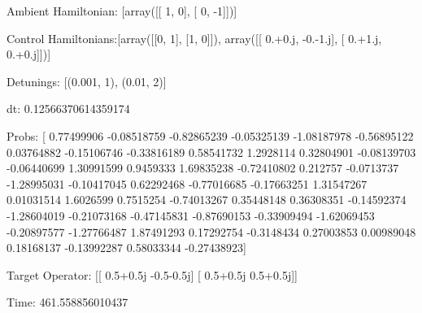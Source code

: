 \documentclass{article}
\begin{document}
    

\newpage

Ambient Hamiltonian: [array([[ 1,  0],
       [ 0, -1]])]

Control Hamiltonians:[array([[0, 1],
       [1, 0]]), array([[ 0.+0.j, -0.-1.j],
       [ 0.+1.j,  0.+0.j]])]

Detunings: [(0.001, 1), (0.01, 2)]

 dt: 0.12566370614359174

Probs: [ 0.77499906 -0.08518759 -0.82865239 -0.05325139 -1.08187978 -0.56895122
  0.03764882 -0.15106746 -0.33816189  0.58541732  1.2928114   0.32804901
 -0.08139703 -0.06440699  1.30991599  0.9459333   1.69835238 -0.72410802
  0.212757   -0.0713737  -1.28995031 -0.10417045  0.62292468 -0.77016685
 -0.17663251  1.31547267  0.01031514  1.6026599   0.7515254  -0.74013267
  0.35448148  0.36308351 -0.14592374 -1.28604019 -0.21073168 -0.47145831
 -0.87690153 -0.33909494 -1.62069453 -0.20897577 -1.27766487  1.87491293
  0.17292754 -0.3148434   0.27003853  0.00989048  0.18168137 -0.13992287
  0.58033344 -0.27438923]

Target Operator: [[ 0.5+0.5j -0.5-0.5j]
 [ 0.5+0.5j  0.5+0.5j]]

Time: 461.558856010437
\end{document}
